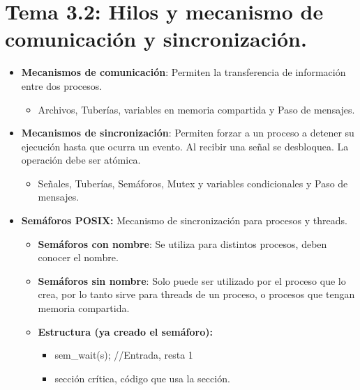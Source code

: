 \documentclass[12pt, twoside, openright]{report} %
\begin{document}
  \section{Tema 3.2: Hilos y mecanismo de comunicación y sincronización.}

  \begin{itemize}
  \item \textbf{Mecanismos de comunicación}: Permiten la transferencia de
    información entre dos procesos.
    

    \begin{itemize}
    \item Archivos, Tuberías, variables en memoria compartida y Paso de
      mensajes.
      
    \end{itemize}
  \item \textbf{Mecanismos de sincronización}: Permiten forzar a un proceso
    a detener su ejecución hasta que ocurra un evento. Al recibir una
    señal se desbloquea. La operación debe ser atómica.
    

    \begin{itemize}
    \item Señales, Tuberías, Semáforos, Mutex y variables condicionales y
      Paso de mensajes.
      
    \end{itemize}
  \item \textbf{Semáforos POSIX:} Mecanismo de sincronización para procesos
    y threads.
    

    \begin{itemize}
    \item \textbf{Semáforos con nombre}: Se utiliza para distintos procesos,
      deben conocer el nombre.
      
    \item \textbf{Semáforos sin nombre}: Solo puede ser utilizado por el
      proceso que lo crea, por lo tanto sirve para threads de un
      proceso, o procesos que tengan memoria compartida.
      
    \item \textbf{Estructura (ya creado el semáforo):}
      

      \begin{itemize}
      \item sem\_wait(s); //Entrada, resta 1
        
      \item sección crítica, código que usa la sección.
        

\end{itemize}
\end{itemize}
\end{itemize}
\end{document}
